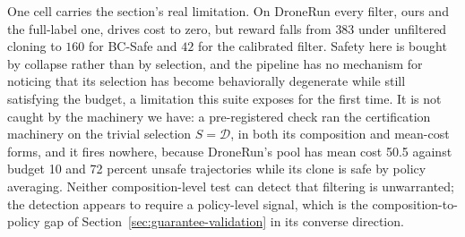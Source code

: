 \documentclass{article} %
\newcommand{\Doff}{\mathcal{D}}
\begin{document}
One cell carries the section's real limitation. On DroneRun every filter, ours and the full-label one, drives cost to zero, but reward falls from $383$ under unfiltered cloning to $160$ for BC-Safe and $42$ for the calibrated filter. Safety here is bought by collapse rather than by selection, and the pipeline has no mechanism for noticing that its selection has become behaviorally degenerate while still satisfying the budget, a limitation this suite exposes for the first time. It is not caught by the machinery we have: a pre-registered check ran the certification machinery on the trivial selection $S = \Doff$, in both its composition and mean-cost forms, and it fires nowhere, because DroneRun's pool has mean cost 50.5 against budget 10 and 72 percent unsafe trajectories while its clone is safe by policy averaging. Neither composition-level test can detect that filtering is unwarranted; the detection appears to require a policy-level signal, which is the composition-to-policy gap of Section~\ref{sec:guarantee-validation} in its converse direction.
\end{document}
